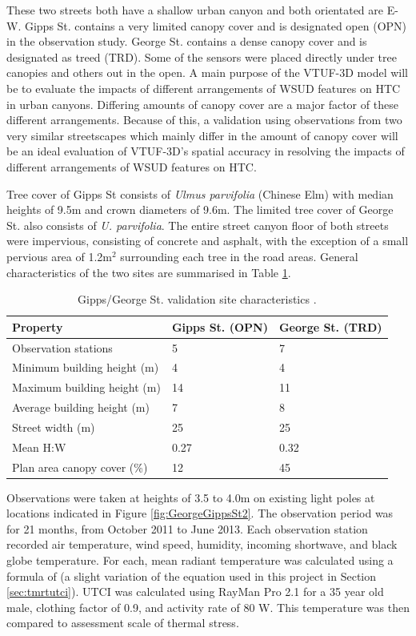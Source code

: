 \documentclass[final,3p,times,authoryear]{elsarticle}
\begin{document}
 


These two streets both have a shallow urban canyon and both orientated are E-W. Gipps St. contains a very limited canopy cover and is designated open (OPN) in the observation study. George St. contains a dense canopy cover and is designated as treed (TRD). Some of the sensors were placed directly under tree canopies and others out in the open. A main purpose of the VTUF-3D model will be to evaluate the impacts of different arrangements of WSUD features on HTC in urban canyons. Differing amounts of canopy cover are a major factor of these different arrangements. Because of this, a validation using observations from two very similar streetscapes which mainly differ in the amount of canopy cover will be an ideal evaluation of VTUF-3D's spatial accuracy in resolving the impacts of different arrangements of WSUD features on HTC.

Tree cover of Gipps St consists of \textit{Ulmus parvifolia} (Chinese Elm) with median heights of 9.5m and crown diameters of 9.6m. The limited tree cover of George St. also consists of \textit{U. parvifolia}. The entire street canyon floor of both streets were impervious, consisting of concrete and asphalt, with the exception of a small pervious area of 1.2m$^{2}$ surrounding each tree in the road areas. General characteristics of the two sites are summarised in Table \ref{tab:comvalpara}.

\begin{table}[!htbp]
\caption{Gipps/George St. validation site characteristics \citep{Coutts2015}. \label{tab:comvalpara}}     
\begin{tabular}{| l | l |l|}
\hline
\textbf{Property} & \textbf{Gipps St. (OPN)} & \textbf{George St. (TRD)} \\ \hline
Observation stations & 5 & 7\\ \hline
Minimum building height (m) & 4 & 4\\ \hline
Maximum building height (m) & 14 & 11\\ \hline
Average building height (m) & 7 & 8 \\ \hline
Street width (m) & 25 & 25 \\ \hline
Mean H:W & 0.27 & 0.32 \\ \hline
Plan area canopy cover (\%) & 12 & 45 \\ \hline

\end{tabular}
\end{table}

Observations were taken at heights of 3.5 to 4.0m on existing light poles at locations indicated in Figure \ref{fig:GeorgeGippsSt2}. The observation period was for 21 months, from October 2011 to June 2013. Each observation station recorded air temperature, wind speed, humidity, incoming shortwave, and black globe temperature. For each, mean radiant temperature was calculated using a formula of \cite{Kantor2011} (a slight variation of the equation used in this project in Section \ref{sec:tmrtutci}). UTCI was calculated using RayMan Pro 2.1 \citep{Matzarakis2010} for a 35 year old male, clothing factor of 0.9, and activity rate of 80 W. This temperature was then compared to \cite{Brode2012a} assessment scale of thermal stress.
\end{document}
